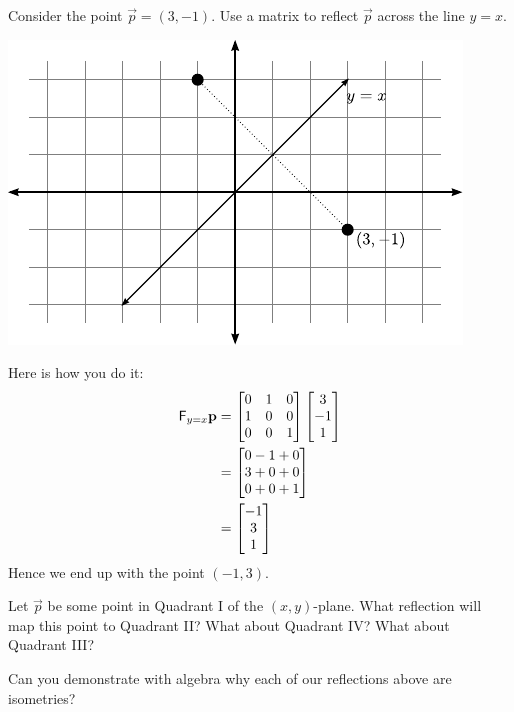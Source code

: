 \documentclass{ximera}
\begin{document}
\begin{example}
Consider the point $\vec{p} =(3,-1)$.  Use a matrix to reflect
$\vec{p}$ across the line $y = x$.
\begin{image}
\includegraphics{refEg1.pdf}
\end{image}
Here is how you do it:
\begin{align*}
\mathsf{F}_{y = x} \mathbf{p} &= 
\begin{bmatrix}
0 & 1 & 0 \\ 
1 & 0 & 0 \\
0 & 0 & 1
\end{bmatrix}
\begin{bmatrix}
3 \\
-1 \\
1
\end{bmatrix}\\
&=
\begin{bmatrix}
0-1+0\\
3+0+0 \\
0+0+1
\end{bmatrix}\\
&=
\begin{bmatrix}
-1\\
3 \\
1
\end{bmatrix}
\end{align*}
Hence we end up with the point $(-1,3)$. 
\end{example}

\begin{question}
Let $\vec{p}$ be some point in Quadrant I of the $(x,y)$-plane. What
reflection will map this point to Quadrant II? What about Quadrant IV?
What about Quadrant III?
\end{question}



\begin{question} 
Can you demonstrate with algebra why each of our reflections above are
isometries?
\end{question}
\end{document}

